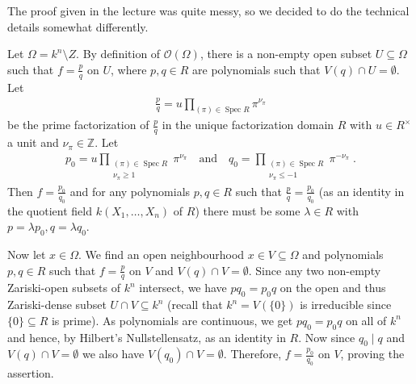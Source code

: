 \documentclass[DIV=14,parskip=full,pointednumbers]{scrartcl}
\theoremstyle{cthm}
\theoremstyle{cvarthm}
\renewenvironment{proof}[1][\proofname]
{\pushQED{\qed}\topsep0pt \partopsep0pt\trivlist\item[\hskip\labelsep\itshape #1.] }{\popQED\endtrivlist\addvspace{6pt plus 6pt}}
\theoremstyle{cdef}
\newcommand{\Oo}{\mathcal{O}}
\newcommand{\IZ}{\mathbb{Z}}
\newcommand{\Spec}{\operatorname{Spec}}
\begin{document}
	\begin{proof} 
		The proof given in the lecture was quite messy, so we decided to do the technical details somewhat differently.
		
		Let $\Omega= k^n\setminus Z$. By definition of $\Oo(\Omega)$, there is a non-empty open subset $U\subseteq\Omega$ such that $f=\frac pq$ on $U$, where $p,q\in R$ are polynomials such that $V(q)\cap U=\emptyset$. Let
		\begin{align*}
			\frac pq=u\prod_{(\pi)\in\Spec R} \pi^{\nu_\pi}
		\end{align*}
		be the prime factorization of $\frac pq$ in the unique factorization domain $R$ with $u\in R^\times$ a unit and $\nu_\pi\in\IZ$. Let
		\begin{align*}
			p_0=u\prod_{\substack{(\pi)\in\Spec R\\\nu_\pi\geq 1}}\pi^{\nu_\pi}\quad\text{and}\quad q_0=\prod_{\substack{(\pi)\in\Spec R\\\nu_\pi\leq -1}}\pi^{-\nu_\pi}\;.
		\end{align*}
		Then $f=\frac{p_0}{q_0}$ and for any polynomials $p,q\in R$ such that $\frac pq=\frac{p_0}{q_0}$ (as an identity in the quotient field $k(X_1,\ldots,X_n)$ of $R$) there must be some $\lambda\in R$ with $p=\lambda p_0,q=\lambda q_0$.
		
		Now let $x\in\Omega$. We find an open neighbourhood $x\in V\subseteq \Omega$ and polynomials $p,q\in R$ such that $f=\frac pq$ on $V$ and $V(q)\cap V=\emptyset$. Since any two non-empty Zariski-open subsets of $k^n$ intersect, we have $pq_0=p_0q$ on the open and thus Zariski-dense subset $U\cap V\subseteq k^n$ (recall that $k^n=V\left(\{0\}\right)$ is irreducible since $\{0\}\subseteq R$ is prime). As polynomials are continuous, we get $pq_0=p_0q$ on all of $k^n$ and hence, by Hilbert's Nullstellensatz, as an identity in $R$. Now since $q_0\mid q$ and $V(q)\cap V=\emptyset$ we also have $V(q_0)\cap V=\emptyset$. Therefore, $f=\frac{p_0}{q_0}$ on $V$, proving the assertion.
	\end{proof}
\end{document}
